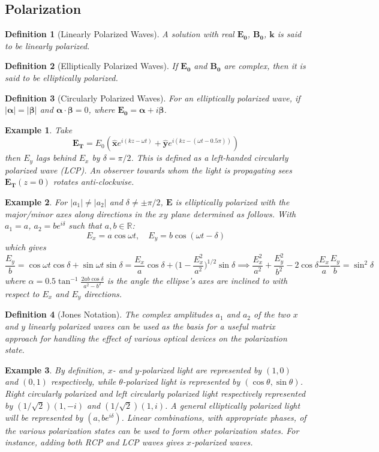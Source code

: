 \documentclass[a4paper]{article}
\newtheorem{defi}{Definition}[section]
\newtheorem{eg}{Example}[section]
\theoremstyle{new}
\begin{document}
\subsection{Polarization}
\begin{defi}[Linearly Polarized Waves]
A solution with real $\mathbf{E_0}$, $\mathbf{B_0}$, $\mathbf{k}$ is said to be linearly polarized.
\end{defi}
\begin{defi}[Elliptically Polarized Waves]
If $\mathbf{E_0}$ and $\mathbf{B_0}$ are complex, then it is said to be elliptically polarized.
\end{defi}
\begin{defi}[Circularly Polarized Waves]
For an elliptically polarized wave, if $|\boldsymbol{\alpha}| = |\boldsymbol{\beta}|$ and $\boldsymbol{\alpha}\cdot\boldsymbol{\beta}=0$, where $\mathbf{E_0}=\boldsymbol{\alpha}+i\boldsymbol{\beta}$.
\end{defi}
\begin{eg}
Take
$$\mathbf{E_T}=E_0(\mathbf{\hat{x}}e^{i(kz-\omega t)}+\mathbf{\hat{y}}e^{i(kz-(\omega t-0.5\pi))})$$
then $E_y$ lags behind $E_x$ by $\delta=\pi/2$. This is defined as a left-handed circularly polarized wave (LCP). An observer towards whom the light is propagating sees $\mathbf{E_T}(z=0)$ rotates anti-clockwise.
\end{eg}
\begin{eg}
For $|a_1|\neq|a_2|$ and $\delta\neq\pm\pi/2$, $\mathbf{E}$ is elliptically polarized with the major/minor axes along directions in the $xy$ plane determined as follows. With $a_1=a$, $a_2=be^{i\delta}$ such that $a,b\in\mathbb{R}$:
$$E_x=a\cos\omega t,\quad E_y=b\cos(\omega t-\delta)$$
which gives
$$\frac{E_y}{b}=\cos\omega t\cos\delta+\sin\omega t\sin\delta=\frac{E_x}{a}\cos\delta+\bigg(1-\frac{E_x^2}{a^2}\bigg)^{1/2}\sin\delta\implies\frac{E_x^2}{a^2}+\frac{E_y^2}{b^2}-2\cos\delta\frac{E_x}{a}\frac{E_y}{b}=\sin^2\delta$$
where $\alpha=0.5\tan^{-1}\frac{2ab\cos\delta}{a^2-b^2}$ is the angle the ellipse's axes are inclined to with respect to $E_x$ and $E_y$ directions.
\end{eg}
\begin{defi}[Jones Notation]
The complex amplitudes $a_1$ and $a_2$ of the two $x$ and $y$ linearly polarized waves can be used as the basis for a useful matrix approach for handling the effect of various optical devices on the polarization state.
\end{defi}
\begin{eg}
By definition, $x$- and $y$-polarized light are represented by $(1,0)$ and $(0,1)$ respectively, while $\theta$-polarized light is represented by $(\cos\theta,\sin\theta)$. Right circularly polarized and left circularly polarized light respectively represented by $(1/\sqrt{2})(1,-i)$ and $(1/\sqrt{2})(1,i)$. A general elliptically polarized light will be represented by $(a,be^{i\delta})$. Linear combinations, with appropriate phases, of the various polarization states can be used to form other polarization states. For instance, adding both RCP and LCP waves gives $x$-polarized waves.
\end{eg}
\end{document}
